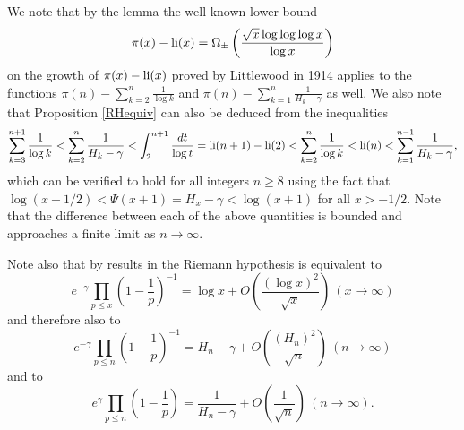 \documentclass[12pt]{article}
\begin{document}
We note that by the lemma the well known lower bound 
$$\pi(x)-\operatorname{li}(x) = \Omega_{\pm} \left(\frac{\sqrt{x} \log \log \log x }{\log x}\right)$$
on the growth of $\pi(x)-\operatorname{li}(x)$ proved by Littlewood in 1914 \cite{litt} applies to the functions $\pi(n) -  \sum_{k = 2}^{n} \frac{1}{\log k}$ and  $\pi(n) -  \sum_{k = 1}^{n} \frac{1}{H_k -\gamma}$ as well.  We also note that Proposition \ref{RHequiv} can also be deduced from the inequalities
\begin{align*}
\sum_{k = 3}^{n+1} \frac{1}{\log k} < \sum_{k = 2}^n \frac{1}{H_k-\gamma} < \int_2^{n+1} \frac{dt}{\log t} = \operatorname{li}(n+1)-\operatorname{li}(2) < \sum_{k = 2}^n \frac{1}{\log k} < \operatorname{li}(n) <   \sum_{k = 1}^{n-1} \frac{1}{H_k-\gamma},
\end{align*}
which can be verified to hold for all integers $n \geq 8$ using the fact that $\log(x+1/2) < \Psi(x+1) = H_{x} - \gamma < \log (x+1)$ for all $x > -1/2$.    Note that the difference between each of the above quantities is bounded and approaches a finite limit as $n \to \infty$. 



Note also that by results in \cite{land} the Riemann hypothesis is equivalent to
$$e^{-\gamma} \prod_{p \leq x}\left(1-\frac{1}{p}\right)^{-1} =  \log x + O\left( \frac{(\log x)^2}{\sqrt{x}} \right) \ (x \to \infty)$$
and therefore also to
$$e^{-\gamma} \prod_{p \leq n}\left(1-\frac{1}{p}\right)^{-1} =  H_n-\gamma + O\left( \frac{(H_n)^2}{\sqrt{n}} \right) \ (n \to \infty)$$
and to
$$e^{\gamma} \prod_{p \leq n}\left(1-\frac{1}{p}\right) =  \frac{1}{H_n-\gamma} + O\left( \frac{1}{\sqrt{n}} \right) \ (n \to \infty).$$

\end{document}
